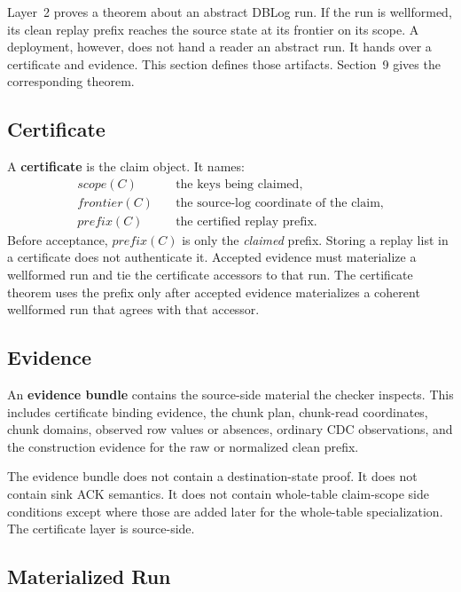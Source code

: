 \documentclass[letterpaper,10pt,twocolumn]{article}
\newcommand{\Scope}{\mathit{scope}}
\newcommand{\Frontier}{\mathit{frontier}}
\newcommand{\CleanPrefix}{\mathit{prefix}}
\begin{document}
Layer~2 proves a theorem about an abstract DBLog run. If the run is
wellformed, its clean replay prefix reaches the source state at its
frontier on its scope. A deployment, however, does not hand a reader an
abstract run. It hands over a certificate and evidence. This section
defines those artifacts. Section~9 gives the corresponding theorem.

\subsection{Certificate}\label{certificate}

A \textbf{certificate} is the claim object. It names:
\[
  \begin{aligned}
    \Scope(C)\quad        &\text{the keys being claimed},\\
    \Frontier(C)\quad      &\text{the source-log coordinate of the claim},\\
    \CleanPrefix(C)\quad   &\text{the certified replay prefix.}
  \end{aligned}
\]
Before acceptance, $\CleanPrefix(C)$ is only the \emph{claimed} prefix.
Storing a replay list in a certificate does not authenticate it.
Accepted evidence must materialize a wellformed run and tie the
certificate accessors to that run. The certificate theorem uses the prefix only
after accepted evidence materializes a coherent wellformed run that
agrees with that accessor.

\subsection{Evidence}\label{evidence}

An \textbf{evidence bundle} contains the source-side material the
checker inspects. This includes certificate binding evidence, the chunk plan,
chunk-read coordinates, chunk domains, observed row values or absences,
ordinary CDC observations, and the construction evidence for the raw or
normalized clean prefix.

The evidence bundle does not contain a destination-state proof. It does
not contain sink ACK semantics. It does not contain whole-table
claim-scope side conditions except where those are added later for the
whole-table specialization. The certificate layer is source-side.

\subsection{Materialized Run}\label{materialized-run}
\end{document}
